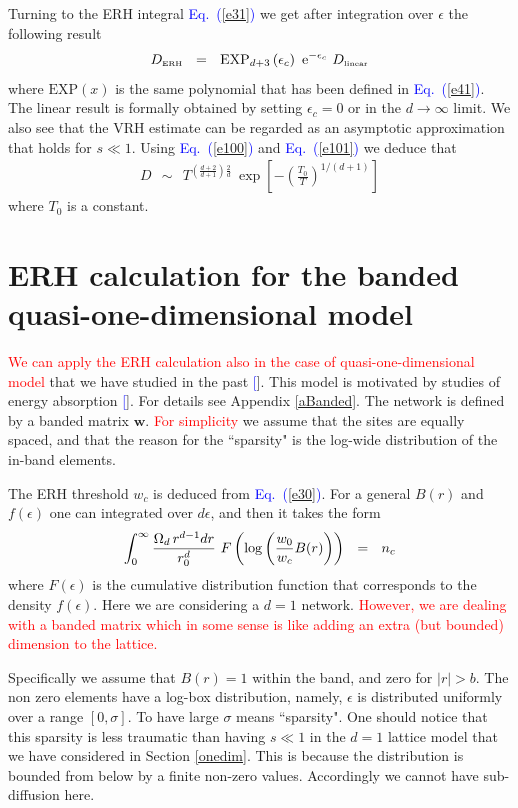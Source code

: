 \documentclass[aps,prb,floats,floatfix,twocolumn]{revtex4}
\newcommand{\eexp}{\mbox{e}^}
\newcommand{\tbox}[1]{\mbox{\tiny #1}}
\newcommand{\mylabel}[1]{\label{#1}}
\newcommand{\beq}{\begin{eqnarray}}
\newcommand{\eeq}{\end{eqnarray}}
\newcommand{\be}[1]{\begin{eqnarray}\ifthenelse{#1=-1}
{\nonumber}{\ifthenelse{#1=0}{}{\mylabel{e#1}}}}
\newcommand{\Eq}[1]{\textcolor{blue}{Eq.\!\!~(\ref{#1})}}
\newcommand{\rmrk}[1]{\textcolor{red}{#1}}
\renewcommand{\cite}[1]{\textcolor{blue}{[\onlinecite{#1}}]} %
\begin{document}
Turning to the ERH integral \Eq{e31} we get  
after integration over $\epsilon$ the following result
%
\be{47}
D_{\tbox{ERH}} \ \ = \ \  
\mathrm{EXP}_{d{+}3}\left(\epsilon_c\right)  \  \eexp{-\epsilon_c}  \ D_{\tbox{linear}}
\eeq 
%
where $\mathrm{EXP}(x)$ is the same polynomial that has been 
defined in \Eq{e41}. 
The linear result is formally obtained by setting ${\epsilon_c=0}$
or in the $d\rightarrow\infty$ limit. 
%
We also see that the VRH estimate can be regarded as an 
asymptotic approximation that holds for ${s\ll1}$. 
Using \Eq{e100} and \Eq{e101} we deduce that 
%
\beq
D \ \ \sim \ \ T^{\left(\frac{d+2}{d+1}\right)\frac{2}{d}} 
\  \exp\left[-\left(\frac{T_0}{T}\right)^{1/(d+1)}\right]
\eeq
%
where $T_0$ is a constant. 


\section{ERH calculation for the banded quasi-one-dimensional model}

\rmrk{We can apply the ERH calculation also in the case 
of quasi-one-dimensional model} that we have 
studied in the past \cite{kbd,kbw}.
This model is motivated by studies of energy absorption \cite{slk}.
For details see Appendix \ref{aBanded}.
%
The network is defined by a banded matrix $\bm{w}$.
\rmrk{For simplicity} we assume that the sites  are equally 
spaced, and that the reason for the ``sparsity" is the log-wide 
distribution of the in-band elements. 
 

The ERH threshold $w_c$ is deduced from \Eq{e30}. 
For a general $B(r)$ and $f(\epsilon)$ one can integrated 
over $d\epsilon$, and then it takes the form 
%
\be{50}
\int_0^{\infty}  
\frac{\Omega_d \, r^{d-1}dr}{r_0^{d}} 
\ F\left(\log\left(\frac{w_0}{w_c}B(r)\right)\right) 
\ \ = \ \ n_c
\eeq 
%
where $F(\epsilon)$ is the cumulative distribution function 
that corresponds to the density $f(\epsilon)$.
Here we are considering a $d{=}1$ network. 
\rmrk{However, we are dealing with a banded matrix  
which in some sense is like adding 
an extra (but bounded) dimension to the lattice.} 
 
Specifically we assume that ${B(r)=1}$ within the band, 
and zero for ${|r|>b}$. 
The non zero elements have a log-box distribution, 
namely, $\epsilon$ is distributed uniformly over a range $[0,\sigma]$. 
To have large $\sigma$ means ``sparsity".
One should notice that this sparsity is less 
traumatic than having $s\ll1$ in the $d{=}1$ lattice model 
that we have considered in Section \ref{onedim}.
This is because the distribution is bounded 
from below by a finite non-zero values. 
Accordingly we cannot have sub-diffusion here.  
\end{document}
